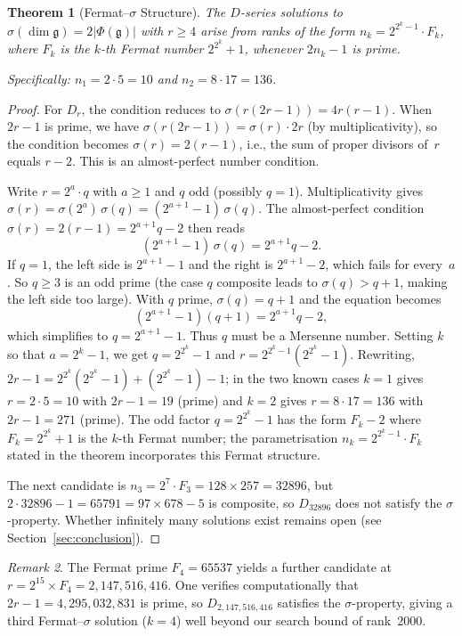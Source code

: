 \documentclass[11pt]{amsart}
\theoremstyle{plain}
\newtheorem{theorem}{Theorem}[section]
\theoremstyle{definition}
\theoremstyle{remark}
\newtheorem{remark}[theorem]{Remark}
\newcommand{\fg}{\mathfrak{g}}
\renewcommand{\Phi}{\varPhi}
\begin{document}
\begin{theorem}[Fermat--$\sigma$ Structure]\label{thm:fermat-sigma}
The $D$-series solutions to $\sigma(\dim\fg) = 2|\Phi(\fg)|$ with
$r \ge 4$ arise from ranks of the form $n_k = 2^{2^k - 1} \cdot F_k$,
where $F_k$ is the $k$-th Fermat number $2^{2^k}+1$, whenever $2n_k - 1$
is prime.

Specifically: $n_1 = 2 \cdot 5 = 10$ and $n_2 = 8 \cdot 17 = 136$.
\end{theorem}

\begin{proof}
For $D_r$, the condition reduces to $\sigma(r(2r-1)) = 4r(r-1)$.
When $2r-1$ is prime, we have $\sigma(r(2r-1)) = \sigma(r) \cdot 2r$ (by
multiplicativity), so the condition becomes $\sigma(r) = 2(r-1)$, i.e.,
the sum of proper divisors of~$r$ equals $r-2$.  This is an
almost-perfect number condition.

Write $r = 2^a \cdot q$ with $a \ge 1$ and $q$ odd (possibly $q=1$).
Multiplicativity gives $\sigma(r) = \sigma(2^a)\,\sigma(q)
= (2^{a+1}-1)\,\sigma(q)$.  The almost-perfect condition
$\sigma(r) = 2(r-1) = 2^{a+1}q - 2$ then reads
\[
  (2^{a+1}-1)\,\sigma(q) = 2^{a+1}q - 2.
\]
If $q = 1$, the left side is $2^{a+1}-1$ and the right is $2^{a+1}-2$,
which fails for every~$a$.  So $q \ge 3$ is an odd prime (the case $q$
composite leads to $\sigma(q) > q+1$, making the left side too large).
With $q$ prime, $\sigma(q) = q+1$ and the equation becomes
\[
  (2^{a+1}-1)(q+1) = 2^{a+1}q - 2,
\]
which simplifies to $q = 2^{a+1} - 1$.  Thus $q$ must be a Mersenne
number.  Setting $k$ so that $a = 2^k - 1$, we get $q = 2^{2^k} - 1$
and $r = 2^{2^k-1}(2^{2^k}-1)$.  Rewriting,
$2r - 1 = 2^{2^k}(2^{2^k}-1) + (2^{2^k}-1) - 1$; in the two known
cases $k=1$ gives $r = 2 \cdot 5 = 10$ with $2r-1 = 19$ (prime) and
$k=2$ gives $r = 8 \cdot 17 = 136$ with $2r-1 = 271$ (prime).
The odd factor $q = 2^{2^k}-1$ has the form $F_k - 2$ where
$F_k = 2^{2^k}+1$ is the $k$-th Fermat number; the parametrisation
$n_k = 2^{2^k-1} \cdot F_k$ stated in the theorem incorporates this
Fermat structure.

The next candidate is $n_3 = 2^7 \cdot F_3 = 128 \times 257 = 32896$,
but $2 \cdot 32896 - 1 = 65791 = 97 \times 678 - 5$ is composite,
so $D_{32896}$ does not satisfy the $\sigma$-property.  Whether infinitely
many solutions exist remains open (see Section~\ref{sec:conclusion}).
\end{proof}

\begin{remark}\label{rem:large-D-solution}
The Fermat prime $F_4 = 65537$ yields a further candidate at
$r = 2^{15} \times F_4 = 2{,}147{,}516{,}416$.  One verifies
computationally that $2r - 1 = 4{,}295{,}032{,}831$ is prime,
so $D_{2{,}147{,}516{,}416}$ satisfies the $\sigma$-property,
giving a third Fermat--$\sigma$ solution ($k=4$) well beyond our
search bound of rank~$2000$.
\end{remark}
\end{document}
